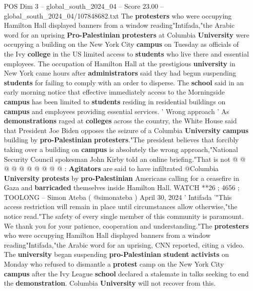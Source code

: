 \begin{textsample}{POS Dim 3 – global\_south\_2024\_04 – Score 23.00 – global\_south\_2024\_04/107848682.txt}  \label{ex:f3_pos_211}
The \textbf{protesters} who were occupying Hamilton Hall displayed banners from a window reading"Intifada,"the Arabic word for an uprising \textbf{Pro-Palestinian} \textbf{protesters} at Columbia \textbf{University} were occupying a building on the New York City \textbf{campus} on Tuesday as officials of the Ivy \textbf{college} in the US limited access to \textbf{students} who live there and essential employees.
The occupation of Hamilton Hall at the prestigious \textbf{university} in New York came hours after \textbf{administrators} said they had begun suspending \textbf{students} for failing to comply with an order to disperse.
The \textbf{school} said in an early morning notice that effective immediately access to the Morningside \textbf{campus} has been limited to \textbf{students} residing in residential buildings on \textbf{campus} and employees providing essential services. ' Wrong approach ' As \textbf{demonstrations} raged at \textbf{colleges} across the country, the White House said that President Joe Biden opposes the seizure of a Columbia \textbf{University} \textbf{campus} building by \textbf{pro-Palestinian} \textbf{protesters}."The president believes that forcibly taking over a building on \textbf{campus} is absolutely the wrong approach,"National Security Council spokesman John Kirby told an online briefing."That is not @ @ @ @ @ @ @ @ @ @ : \textbf{Agitators} are said to have infiltrated @Columbia \textbf{University} \textbf{protests} by \textbf{pro-Palestinian} Americans calling for a ceasefire in Gaza and \textbf{barricaded} themselves inside Hamilton Hall.
WATCH **26 ; 4656 ; TOOLONG -- Simon Ateba ( @simonateba ) April 30, 2024 ' Intifada '"This access restriction will remain in place until circumstances allow otherwise,"the notice read."The safety of every single member of this community is paramount.
We thank you for your patience, cooperation and understanding."The \textbf{protesters} who were occupying Hamilton Hall displayed banners from a window reading"Intifada,"the Arabic word for an uprising, CNN reported, citing a video.
The \textbf{university} began suspending \textbf{pro-Palestinian} \textbf{student} \textbf{activists} on Monday who refused to dismantle a \textbf{protest} camp on the New York City \textbf{campus} after the Ivy League \textbf{school} declared a stalemate in talks seeking to end the \textbf{demonstration}.
Columbia \textbf{University} will not recover from this.

\end{textsample}
